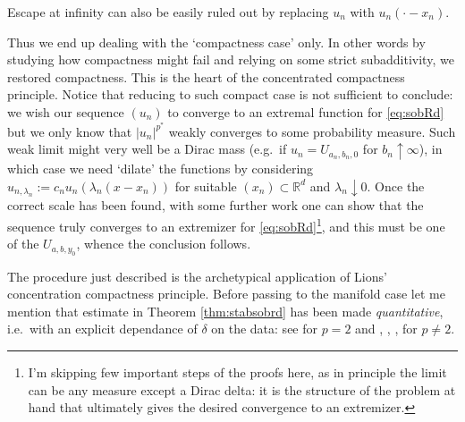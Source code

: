 \documentclass[11pt]{article}
\numberwithin{equation}{section}
\newcommand{\R}{\mathbb{R}}
\begin{document}
Escape at infinity can also be easily ruled out by replacing $u_n$ with $u_n(\cdot-x_n)$.

Thus  we end up dealing with the `compactness case' only. In other words by studying how compactness might fail and relying on some strict subadditivity, we restored compactness. This is the heart of the concentrated compactness principle. Notice that reducing to such compact case  is not sufficient to conclude:  we wish  our sequence $(u_n)$ to converge to an extremal function for \eqref{eq:sobRd} but we only know that $|u_n|^{p^*}$ weakly converges to some probability measure. Such weak limit might very well be a Dirac mass (e.g.\ if $u_n=U_{a_n,b_n,0}$ for $b_n\uparrow\infty$), in which case we need `dilate' the functions by considering $u_{n,\lambda_n}:=c_{n} u_n(\lambda_n (x-x_n))$ for suitable $(x_n)\subset\R^d$ and $\lambda_n\downarrow0$. Once the correct scale has been found, with some further work one can show that the sequence truly converges to an extremizer for  \eqref{eq:sobRd}\footnote{I'm skipping few important steps of the proofs here, as in principle the limit can be any measure except a Dirac delta: it is the structure of the problem at hand that ultimately gives the desired convergence to an extremizer.}, and this must be   one of the $U_{a,b,y_0}$, whence the conclusion follows. 

The procedure just described is the archetypical application of Lions' concentration compactness principle. Before passing to the manifold case let me mention that estimate in Theorem \ref{thm:stabsobrd} has been made \emph{quantitative}, i.e.\ with an explicit dependance of $\delta$ on the data: see  \cite{BianchiEgnell91} for $p=2$ and \cite{CianchiFuscoMaggiPratelli09},  \cite{FigalliNeumayer19}, \cite{Neumayer19}, \cite{FigalliZhang22} for $p\neq 2$. 
\end{document}
